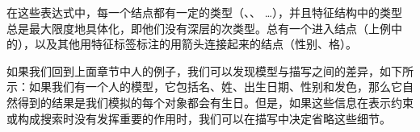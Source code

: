 在这些表达式中，每一个结点都有一定的类型（、、 \ldots），并且特征结构中的类型总是最大限度地具体化，即他们没有深层的次类型。总有一个进入结点（上例中的），以及其他用特征标签标注的用箭头连接起来的结点（\textsc{性别}、\textsc{格}）。

如果我们回到上面章节中人的例子，我们可以发现模型与描写之间的差异，如下所示：如果我们有一个人的模型，它包括名、姓、出生日期、性别和发色，那么它自然得到的结果是我们模拟的每个对象都会有生日。但是，如果这些信息在表示约束或构成搜索时没有发挥重要的作用时，我们可以在描写中决定省略这些细节。

